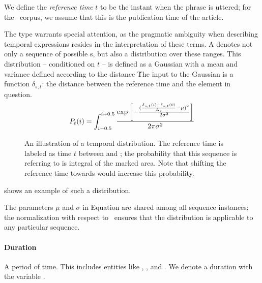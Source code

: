 We define the \textit{reference time} $t$ \cite{key:1947reichenback-temporal}
	to be the instant when the phrase 
	is uttered; for the \tempeval\ corpus, we assume that this is the 
	publication time of the article.

The  type warrants special attention, as the pragmatic ambiguity 
	when describing temporal expressions resides in the interpretation of these
	terms.
A  denotes not only a sequence of possible
	s, but also a distribution over these ranges.
This distribution -- conditioned on $t$ --
	is defined as a Gaussian with a mean and variance defined according
	to the distance \seqjump\.
The input to the Gaussian is a function $\delta_{s,t}$:
	the distance between the reference time 
	and the element in question.
\begin{equation}
\label{eqn:gaussian}
	P_t(i) = 
	\int_{i-0.5}^{i+0.5}
		\frac{
			\exp\left[-\frac{
					(\frac{\delta_{s,t}(i)-\delta_{s,t}(0)}{\Delta_s} - \mu)^2
				}{
					2\sigma^2
				}
			\right]
		}{
			2\pi\sigma^2
		}
\end{equation}
\begin{figure}[t]
\begin{center}
	\resizebox{1.1\hsize}{!}{
		
	}
	\caption{
		\label{fig:distribution}
		An illustration of a temporal distribution.
		The reference time is labeled as time $t$ between  and 
			; the probability that this sequence is referring to
			 is integral of the marked area.
		Note that shifting the reference time towards  would increase
			this probability.
	}
\end{center}
\end{figure}
 shows an example of such a distribution.

The parameters $\mu$ and $\sigma$ in Equation  are shared
	among all sequence instances; the normalization
	with respect to \seqjump\ ensures that the distribution is applicable
	to any particular sequence.
	
\paragraph{Duration}
A period of time.
This includes entities like , , and .
We denote a duration with the variable \dur.

